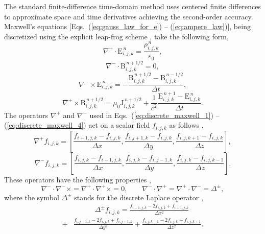 \documentclass[10pt, a4paper, twoside, openright]{report}
\renewcommand{\vec}[1]{\boldsymbol{\mathrm{#1}}}
\begin{document}
The standard finite-difference time-domain method uses centered finite differences to approximate space and time derivatives achieving the second-order accuracy. Maxwell's equations [Eqs.~(\ref{eq:gauss_law_for_e}) -- (\ref{eq:ampere_law})], being discretized using the explicit leap-frog scheme \cite{Press2007}, take the following form,
\begin{equation}\label{eq:discrete_maxwell_1}
	\nabla^{+} \cdot \vec{E}_{i, j, k}^{\,n} = \frac{\rho_{i, j, k}^{\,n}}{\varepsilon_0},
\end{equation}
\begin{equation}\label{eq:discrete_maxwell_2}
	\nabla^{-} \cdot \vec{B}_{i, j, k}^{\,n + 1/2} = 0,
\end{equation}
\begin{equation}\label{eq:discrete_maxwell_3}
	\nabla^{-} \times \vec{E}_{i, j, k}^{\,n} = -\frac{\vec{B}_{i, j, k}^{\,n + 1/2} - \vec{B}_{i, j, k}^{\,n - 1/2}}{\Delta t},
\end{equation}
\begin{equation}\label{eq:discrete_maxwell_4}
	\nabla^{+} \times \vec{B}_{i, j, k}^{\,n + 1/2} = \mu_{0} \vec{J}_{i, j, k}^{\,n + 1/2} + \frac{1}{c^{2}} \frac{\vec{E}_{i, j, k}^{\,n + 1} - \vec{E}_{i, j, k}^{\,n}}{\Delta t}.
\end{equation}
The operators $ \nabla^{+} $ and $ \nabla^{-} $ used in Eqs.~(\ref{eq:discrete_maxwell_1}) -- (\ref{eq:discrete_maxwell_4}) act on a scalar field $ f_{i, j, k} $ as follows \cite{Esirkepov2001},
\begin{equation}\label{eq:nabla_plus}
	\nabla^{+} f_{i, j, k} = \left[ \frac{f_{i + 1, j, k} - f_{i, j, k}}{\Delta x}, \frac{f_{i, j + 1, k} - f_{i, j, k}}{\Delta y}, \frac{f_{i, j, k + 1} - f_{i, j, k}}{\Delta z} \right], 
\end{equation}
\begin{equation}\label{eq:nabla_minus}
	\nabla^{-} f_{i, j, k} = \left[ \frac{f_{i, j, k} - f_{i - 1, j, k}}{\Delta x}, \frac{f_{i, j, k} - f_{i, j - 1, k}}{\Delta y}, \frac{f_{i, j, k} - f_{i, j, k - 1}}{\Delta z} \right].
\end{equation}
These operators have the following properties \cite{Esirkepov2001},
\begin{equation}\label{eq:nabla_properties}
	\nabla^{-} \cdot \nabla^{-} \times = \nabla^{+} \cdot \nabla^{+} \times = 0, \qquad \nabla^{-} \cdot \nabla^{+} = \nabla^{+} \cdot \nabla^{-} = \Delta^{\pm},
\end{equation}
where the symbol $ \Delta^{\pm} $ stands for the discrete Laplace operator \cite{Esirkepov2001},
\begin{equation}\label{eq:discrete_laplace}
	\begin{aligned}
	& \quad \quad \quad \Delta^{\pm} f_{i, j, k} = \frac{f_{i - 1, j, k} - 2 f_{i, j, k} + f_{i + 1, j, k}}{\Delta x^{2}} \\[3mm]
	+ & \frac{f_{i, j - 1, k} - 2 f_{i, j, k} + f_{i, j + 1, k}}{\Delta y^{2}} + \frac{f_{i, j, k - 1} - 2 f_{i, j, k} + f_{i, j, k + 1}}{\Delta z^{2}}.
	\end{aligned}
\end{equation}
\end{document}
